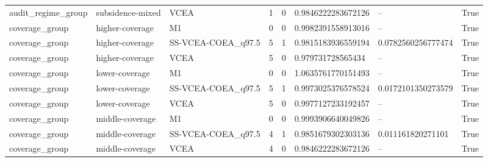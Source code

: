 \begin{landscape}
\begin{longtable}{llllllll}
audit\_regime\_group & subsidence-mixed & VCEA & 1 & 0 & 0.9846222283672126 & -- & True \\
coverage\_group & higher-coverage & M1 & 0 & 0 & 0.9982391558913016 & -- & True \\
coverage\_group & higher-coverage & SS-VCEA-COEA\_q97.5 & 5 & 1 & 0.9815183936559194 & 0.0782560256777474 & True \\
coverage\_group & higher-coverage & VCEA & 5 & 0 & 0.979731728565434 & -- & True \\
coverage\_group & lower-coverage & M1 & 0 & 0 & 1.0635761770151493 & -- & True \\
coverage\_group & lower-coverage & SS-VCEA-COEA\_q97.5 & 5 & 1 & 0.9973025376578524 & 0.0172101350273579 & True \\
coverage\_group & lower-coverage & VCEA & 5 & 0 & 0.9977127233192457 & -- & True \\
coverage\_group & middle-coverage & M1 & 0 & 0 & 0.9993906640049826 & -- & True \\
coverage\_group & middle-coverage & SS-VCEA-COEA\_q97.5 & 4 & 1 & 0.9851679302303136 & 0.011161820271101 & True \\
coverage\_group & middle-coverage & VCEA & 4 & 0 & 0.9846222283672126 & -- & True \\
\bottomrule
\end{longtable}
\end{landscape}
